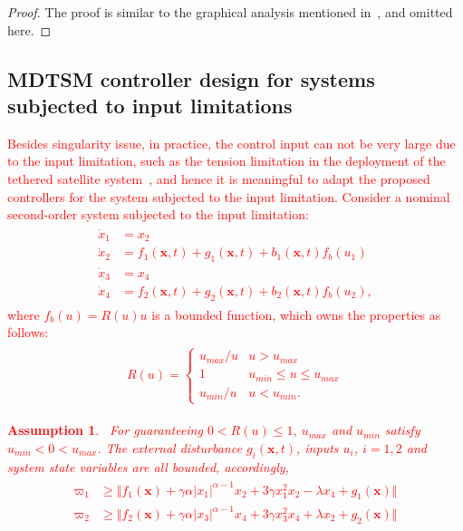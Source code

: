 \documentclass[3p]{elsarticle}
\theoremstyle{plain}
\newtheorem{myas}{Assumption}
\theoremstyle{remark}
\begin{document}
\begin{proof}
The proof is similar to the graphical analysis mentioned in~\cite{feng2013nonsingular}, and omitted here.
\end{proof}
\subsection{MDTSM controller design for systems subjected to input limitations}
\textcolor{red}{
Besides singularity issue, in practice, the control input can not be very large due to the input limitation, such as the tension limitation in the deployment of the tethered satellite system~\cite{Ma201667}, and hence it is meaningful to adapt the proposed controllers for the system subjected to the input limitation. Consider a nominal second-order system subjected to the input limitation:
\begin{align}
\begin{split}
\dot x_1 &= x_2\\
\dot x_2 &= f_1(\bm x,t)+g_1(\bm x,t)+b_1(\bm x,t)f_b(u_1)\\
\dot x_3 &= x_4\\
\dot x_4 &= f_2(\bm x,t)+g_2(\bm x,t)+b_2(\bm x,t)f_b(u_2),\label{eq:second-order system subjected to limitation}
\end{split}
\end{align}
where $f_b(u) = R(u)u$ is a bounded function, which owns the properties as follows:
\begin{align}\begin{split}
  R(u)=\begin{cases}
  u_{max}/u &u>u_{max}\\
  1&u_{min}\le u\le u_{max}\\
  u_{min}/u& u<u_{min}.
\end{cases}\end{split}
\end{align}
\begin{myas}~\cite{Ma201667}\label{myas:1}
For guaranteeing $0<R(u)\le 1$, $u_{max}$ and $u_{min}$ satisfy $u_{min}<0<u_{max}$. The external disturbance $g_i(\bm x,t)$, inputs $u_i$, $i=1,2$ and system state variables are all bounded, accordingly,
\begin{align}\begin{split}
  \varpi_1 &\ge \Vert f_1(\bm x)+\gamma\alpha\vert x_1\vert^{\alpha-1}x_2+3\gamma x_1^2x_2-\lambda x_4+g_1(\bm x)\Vert\\
  \varpi_2 &\ge \Vert f_2(\bm x)+\gamma\alpha\vert x_3\vert^{\alpha-1}x_4+3\gamma x_3^2x_4+\lambda x_2+g_2(\bm x)\Vert\\

\end{split}
\end{align}
\end{myas}}
\end{document}
